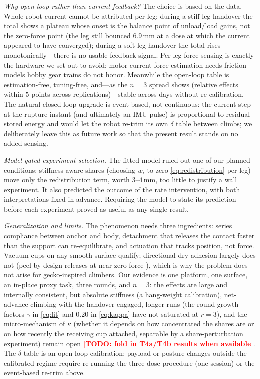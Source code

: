 \documentclass[journal]{IEEEtran}
\newcommand{\TODO}[1]{\textcolor{red}{\textbf{[TODO: #1]}}}
\begin{document}
\emph{Why open loop rather than current feedback?} The choice is based
on the data. Whole-robot current
cannot be attributed per leg: during a stiff-leg handover the total
shows a plateau whose onset is the balance point of unload/load gains,
not the zero-force point (the leg still bounced $6.9$\,mm at a dose at
which the current appeared to have converged); during a soft-leg
handover the total rises monotonically---there is no usable feedback
signal. Per-leg force sensing is exactly the hardware we set out to
avoid; motor-current force
estimation \cite{wahrburg2018motor} needs friction models hobby gear
trains do not honor. Meanwhile the open-loop table is estimation-free,
tuning-free, and---as the $n{=}3$ spread shows (relative effects within
$5$ points across replications)---stable across days without
re-calibration. The natural closed-loop upgrade is event-based, not
continuous: the current step at the rupture instant (and ultimately an
IMU pulse) is proportional to residual stored energy and would let the
robot re-trim its own $\delta$ table between climbs; we deliberately
leave this as future work so that the present result stands on no
added sensing.

\emph{Model-gated experiment selection.} The fitted model ruled out one
of our planned conditions: stiffness-aware shares (choosing $w_i$ to
zero \eqref{eq:redistribution} per leg) move only the redistribution
term, worth $3$--$4$\,mm, too little to justify a wall experiment. It
also predicted the outcome of the rate intervention, with both
interpretations fixed in advance. Requiring the model to state its
prediction before each experiment proved as useful as any single
result.

\emph{Generalization and limits.} The phenomenon needs three
ingredients: series compliance between anchor and body, detachment that
releases the contact faster than the support can re-equilibrate, and
actuation that tracks position, not force. Vacuum cups on any smooth
surface qualify; directional dry adhesion largely does not (peel-by-design
releases at near-zero force \cite{autumn2006frictional,kim2008smooth}),
which is why the problem does not arise for gecko-inspired climbers.
Our evidence is one platform, one surface, an in-place proxy task, three
rounds, and $n{=}3$: the effects are large and internally consistent,
but absolute
stiffness (a hang-weight calibration), net-advance climbing with the
handover engaged, longer runs (the round-growth factors $\gamma$ in \eqref{eq:fit} and
$0.20$ in \eqref{eq:kappa} have not saturated at $r{=}3$), and the
micro-mechanism of $\kappa$ (whether it depends on how concentrated the
shares are or on how recently the receiving cup attached, separable by
a share-perturbation experiment) remain open
\TODO{fold in T4a/T4b results when available}. The $\delta$ table is an
open-loop calibration: payload or posture changes outside the
calibrated regime require re-running the three-dose procedure (one
session) or the event-based re-trim above.
\end{document}
